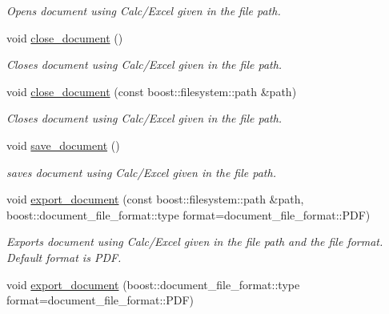 \begin{DoxyCompactItemize}
\begin{DoxyCompactList}\small\item\em Opens document using Calc/\-Excel given in the file path. \end{DoxyCompactList}\item 
\hypertarget{classboost_1_1document_a8b5fa1ec18c56babaa03739ebe363359}{void \hyperlink{classboost_1_1document_a8b5fa1ec18c56babaa03739ebe363359}{close\-\_\-document} ()}\label{classboost_1_1document_a8b5fa1ec18c56babaa03739ebe363359}

\begin{DoxyCompactList}\small\item\em Closes document using Calc/\-Excel given in the file path. \end{DoxyCompactList}\item 
\hypertarget{classboost_1_1document_ae6fb37bb361f16b03090b4aa5221a869}{void \hyperlink{classboost_1_1document_ae6fb37bb361f16b03090b4aa5221a869}{close\-\_\-document} (const boost\-::filesystem\-::path \&path)}\label{classboost_1_1document_ae6fb37bb361f16b03090b4aa5221a869}

\begin{DoxyCompactList}\small\item\em Closes document using Calc/\-Excel given in the file path. \end{DoxyCompactList}\item 
\hypertarget{classboost_1_1document_a5523760f4758f1d45632d00d8c997c98}{void \hyperlink{classboost_1_1document_a5523760f4758f1d45632d00d8c997c98}{save\-\_\-document} ()}\label{classboost_1_1document_a5523760f4758f1d45632d00d8c997c98}

\begin{DoxyCompactList}\small\item\em saves document using Calc/\-Excel given in the file path. \end{DoxyCompactList}\item 
\hypertarget{classboost_1_1document_acad48dd9e10a0e56b102003ddedc046e}{void \hyperlink{classboost_1_1document_acad48dd9e10a0e56b102003ddedc046e}{export\-\_\-document} (const boost\-::filesystem\-::path \&path, boost\-::document\-\_\-file\-\_\-format\-::type format=document\-\_\-file\-\_\-format\-::\-P\-D\-F)}\label{classboost_1_1document_acad48dd9e10a0e56b102003ddedc046e}

\begin{DoxyCompactList}\small\item\em Exports document using Calc/\-Excel given in the file path and the file format. Default format is P\-D\-F. \end{DoxyCompactList}\item 
\hypertarget{classboost_1_1document_adfb85f51a85f221a428a6d2fc87e13d4}{void \hyperlink{classboost_1_1document_adfb85f51a85f221a428a6d2fc87e13d4}{export\-\_\-document} (boost\-::document\-\_\-file\-\_\-format\-::type format=document\-\_\-file\-\_\-format\-::\-P\-D\-F)}\label{classboost_1_1document_adfb85f51a85f221a428a6d2fc87e13d4}


\end{DoxyCompactItemize}
